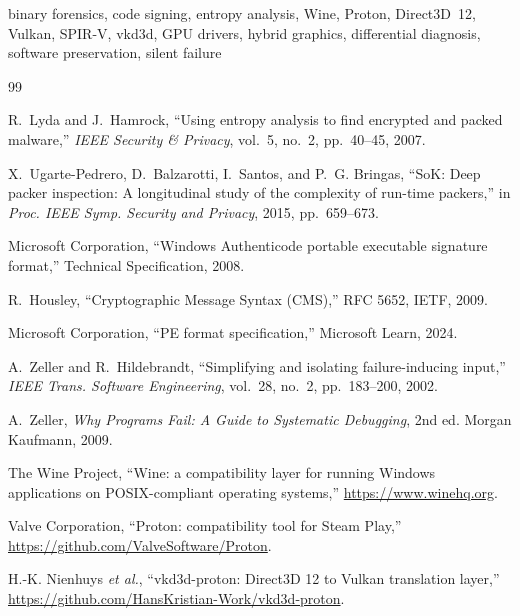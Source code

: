 \documentclass[conference,10pt]{IEEEtran}
\begin{document}
\begin{IEEEkeywords}
binary forensics, code signing, entropy analysis, Wine, Proton, Direct3D~12,
Vulkan, SPIR-V, vkd3d, GPU drivers, hybrid graphics, differential diagnosis,
software preservation, silent failure
\end{IEEEkeywords}
















\begin{thebibliography}{99}

R.~Lyda and J.~Hamrock, ``Using entropy analysis to find encrypted and packed
malware,'' \emph{IEEE Security \& Privacy}, vol.~5, no.~2, pp.~40--45, 2007.

X.~Ugarte-Pedrero, D.~Balzarotti, I.~Santos, and P.~G. Bringas, ``SoK: Deep
packer inspection: A longitudinal study of the complexity of run-time packers,''
in \emph{Proc. IEEE Symp. Security and Privacy}, 2015, pp.~659--673.

Microsoft Corporation, ``Windows Authenticode portable executable signature
format,'' Technical Specification, 2008.

R.~Housley, ``Cryptographic Message Syntax (CMS),'' RFC 5652, IETF, 2009.

Microsoft Corporation, ``PE format specification,'' Microsoft Learn, 2024.

A.~Zeller and R.~Hildebrandt, ``Simplifying and isolating failure-inducing
input,'' \emph{IEEE Trans. Software Engineering}, vol.~28, no.~2, pp.~183--200,
2002.

A.~Zeller, \emph{Why Programs Fail: A Guide to Systematic Debugging}, 2nd ed.
Morgan Kaufmann, 2009.

The Wine Project, ``Wine: a compatibility layer for running Windows applications
on POSIX-compliant operating systems,'' \url{https://www.winehq.org}.

Valve Corporation, ``Proton: compatibility tool for Steam Play,''
\url{https://github.com/ValveSoftware/Proton}.

H.-K. Nienhuys \emph{et al.}, ``vkd3d-proton: Direct3D 12 to Vulkan translation
layer,'' \url{https://github.com/HansKristian-Work/vkd3d-proton}.


\end{thebibliography}
\end{document}
